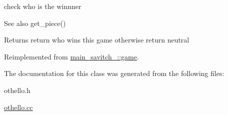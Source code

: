 check who is the winnner 

\begin{DoxySeeAlso}{See also}
get\+\_\+piece() 
\end{DoxySeeAlso}
\begin{DoxyReturn}{Returns}
return who wins this game otherwise return neutral 
\end{DoxyReturn}


Reimplemented from \hyperlink{classmain__savitch__14_1_1game_a081611c42aa66b4d91bbefeec47c7c4e}{main\+\_\+savitch\+\_\+::game}.



The documentation for this class was generated from the following files\+:\begin{DoxyCompactItemize}
\item 
othello.\+h\item 
\hyperlink{othello_8cc}{othello.\+cc}\end{DoxyCompactItemize}
